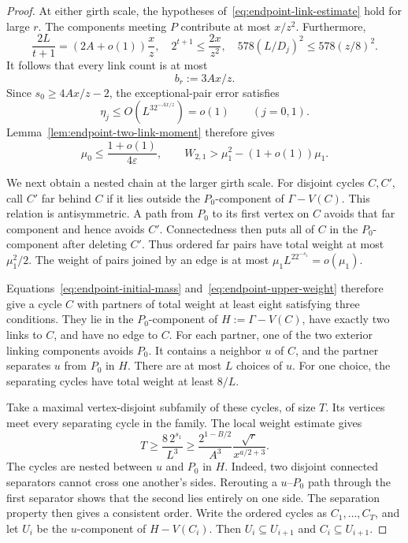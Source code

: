 \begin{proof}
At either girth scale, the hypotheses of~\eqref{eq:endpoint-link-estimate} hold for large $r$.
The components meeting $P$ contribute at most $x/z^2$.
Furthermore,
\[
 \frac{2L}{t+1}=(2A+o(1))\frac{x}{z},\quad
 2^{t+1}\le\frac{2x}{z^2},\quad
 578(L/D_j)^2\le578(z/8)^2.
\]
It follows that every link count is at most
\[
 b_r:=3Ax/z.
\]
Since $s_0\ge4Ax/z-2$, the exceptional-pair error satisfies
\[
 \eta_j\le O(L^32^{-Ax/z})=o(1)
 \qquad(j=0,1).
\]
Lemma~\ref{lem:endpoint-two-link-moment} therefore gives
\begin{equation}\label{eq:endpoint-upper-weight}
 \mu_0\le\frac{1+o(1)}{4\varepsilon},
 \qquad W_{2,1}>\mu_1^2-(1+o(1))\mu_1.
\end{equation}

We next obtain a nested chain at the larger girth scale.
For disjoint cycles $C,C'$, call $C'$ far behind $C$ if it lies outside the $P_0$-component of $\Gamma-V(C)$.
This relation is antisymmetric.
A path from $P_0$ to its first vertex on $C$ avoids that far component and hence avoids $C'$.
Connectedness then puts all of $C$ in the $P_0$-component after deleting $C'$.
Thus ordered far pairs have total weight at most $\mu_1^2/2$.
The weight of pairs joined by an edge is at most $\mu_1L^22^{-s_1}=o(\mu_1)$.

Equations~\eqref{eq:endpoint-initial-mass} and~\eqref{eq:endpoint-upper-weight} therefore give a cycle $C$ with partners of total weight at least eight satisfying three conditions.
They lie in the $P_0$-component of $H:=\Gamma-V(C)$, have exactly two links to $C$, and have no edge to $C$.
For each partner, one of the two exterior linking components avoids $P_0$.
It contains a neighbor $u$ of $C$, and the partner separates $u$ from $P_0$ in $H$.
There are at most $L$ choices of $u$.
For one choice, the separating cycles have total weight at least $8/L$.

Take a maximal vertex-disjoint subfamily of these cycles, of size $T$.
Its vertices meet every separating cycle in the family.
The local weight estimate gives
\begin{equation}\label{eq:endpoint-chain-size}
 T\ge\frac{8\,2^{s_1}}{L^3}
 \ge\frac{2^{1-B/2}}{A^3}\frac{\sqrt r}{x^{a/2+3}}.
\end{equation}
The cycles are nested between $u$ and $P_0$ in $H$.
Indeed, two disjoint connected separators cannot cross one another's sides.
Rerouting a $u$--$P_0$ path through the first separator shows that the second lies entirely on one side.
The separation property then gives a consistent order.
Write the ordered cycles as $C_1,\ldots,C_T$, and let $U_i$ be the $u$-component of $H-V(C_i)$.
Then $U_i\subseteq U_{i+1}$ and $C_i\subseteq U_{i+1}$.


\end{proof}
